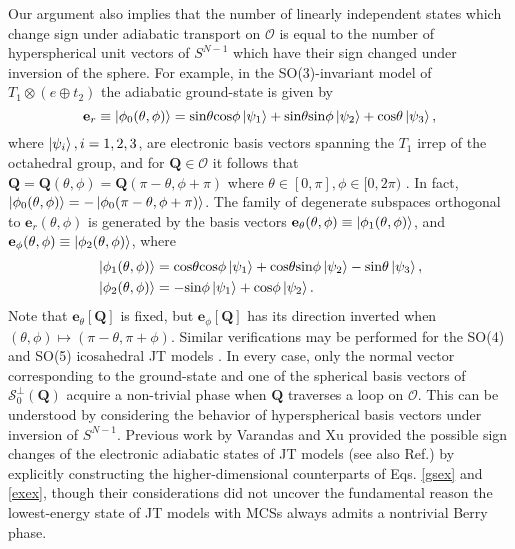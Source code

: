 \documentclass[superscriptaddress,showpacs,amsmath,amssymb,pra,twocolumn]{revtex4-1}
\begin{document}
Our argument also implies that the number of linearly independent
states which change sign under adiabatic transport on $\mathcal{O}$
is equal to the number of hyperspherical unit vectors of $S^{N-1}$
which have their sign changed under inversion of the sphere. For example,
in the SO(3)-invariant model of $T_{1}\otimes(e\oplus t_{2})$ \cite{obrien_dynamic_1969-2}
the adiabatic ground-state is given by 
\begin{equation}
\mathbf{e}_{r}\equiv\ket{\phi_{0}(\theta,\phi)}=\text{sin}\theta\text{cos}\phi\ket{\psi_{1}}+\text{sin}\theta\text{sin}\phi\ket{\psi_{2}}+\text{cos}\theta\ket{\psi_{3}},\label{gsex}
\end{equation}
where $\ket{\psi_{i}},i=1,2,3$, are electronic basis vectors spanning
the $T_{1}$ irrep of the octahedral group, and for $\mathbf{Q}\in\mathcal{O}$
it follows that $\mathbf{Q}=\mathbf{Q}(\theta,\phi)=\mathbf{Q}(\pi-\theta,\phi+\pi)$
where $\theta\in[0,\pi],\phi\in[0,2\pi)$ \cite{obrien_dynamic_1969-2}.
In fact, $\ket{\phi_{0}(\theta,\phi)}=-\ket{\phi_{0}(\pi-\theta,\phi+\pi)}$.
The family of degenerate subspaces orthogonal to $\mathbf{e}_{r}(\theta,\phi)$
is generated by the basis vectors $\mathbf{e}_{\theta}(\theta,\phi)\equiv\ket{\phi_{1}(\theta,\phi)}$,
and $\mathbf{e}_{\phi}(\theta,\phi)\equiv\ket{\phi_{2}(\theta,\phi)}$,
where
\begin{align}
 & \ket{\phi_{1}(\theta,\phi)}=\text{cos}\theta\text{cos}\phi\ket{\psi_{1}}+\text{cos}\theta\text{sin}\phi\ket{\psi_{2}}-\text{sin}\theta\ket{\psi_{3}},\nonumber \\
 & \ket{\phi_{2}(\theta,\phi)}=-\text{sin}\phi\ket{\psi_{1}}+\text{cos}\phi\ket{\psi_{2}}.\label{exex}
\end{align}
Note that $\mathbf{e}_{\theta}[\mathbf{Q}]$ is fixed, but $\mathbf{e}_{\phi}[\mathbf{Q}]$
has its direction inverted when $(\theta,\phi)\mapsto(\pi-\theta,\pi+\phi)$.
Similar verifications may be performed for the SO(4) and SO(5) icosahedral
JT models \cite{varandas_geometric_2004,varandas_geometrical_2010}.
In every case, only the normal vector corresponding to the ground-state
and one of the spherical basis vectors of $\mathcal{S}_{0}^{\perp}(\mathbf{Q})$
acquire a non-trivial phase when $\mathbf{Q}$ traverses a loop
on $\mathcal{O}$. This can be understood by considering the behavior
of hyperspherical basis vectors under inversion of $S^{N-1}$. Previous
work by Varandas and Xu \cite{varandas_geometric_2004} provided
the possible sign changes of the electronic adiabatic states of JT
models (see also Ref.\cite{varandas_geometrical_2010}) by explicitly
constructing the higher-dimensional counterparts of Eqs. \ref{gsex}
and \ref{exex}, though their considerations did not uncover the fundamental
reason the lowest-energy state of JT models with MCSs always admits a nontrivial Berry phase.
\end{document}
